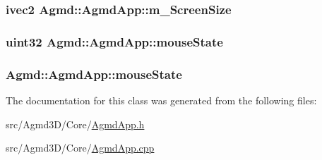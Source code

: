 \hypertarget{class_agmd_1_1_agmd_app_acc122b7ae41e81cabf3e1dfcea5c8ec5}{
\subsubsection[{m\+\_\+\+Screen\+Size}]{\setlength{\rightskip}{0pt plus 5cm}ivec2 Agmd\+::\+Agmd\+App\+::m\+\_\+\+Screen\+Size\hspace{0.3cm}{\ttfamily [protected]}}}\label{class_agmd_1_1_agmd_app_acc122b7ae41e81cabf3e1dfcea5c8ec5}
\hypertarget{class_agmd_1_1_agmd_app_ac57faa65a18bb1d5751b25e36364860e}{
\subsubsection[{mouse\+State}]{\setlength{\rightskip}{0pt plus 5cm}uint32 Agmd\+::\+Agmd\+App\+::mouse\+State\hspace{0.3cm}{\ttfamily [protected]}}}\label{class_agmd_1_1_agmd_app_ac57faa65a18bb1d5751b25e36364860e}
\hypertarget{class_agmd_1_1_agmd_app_ae44d69b5ac62fb8ac221140e883132af}{
\subsubsection[{mouse\+State}]{ Agmd\+::\+Agmd\+App\+::mouse\+State\hspace{0.3cm}{\ttfamily [protected]}}}\label{class_agmd_1_1_agmd_app_ae44d69b5ac62fb8ac221140e883132af}


The documentation for this class was generated from the following files\+:\begin{DoxyCompactItemize}
\item 
src/\+Agmd3\+D/\+Core/\hyperlink{_agmd3_d_2_core_2_agmd_app_8h}{Agmd\+App.\+h}\item 
src/\+Agmd3\+D/\+Core/\hyperlink{_agmd3_d_2_core_2_agmd_app_8cpp}{Agmd\+App.\+cpp}\end{DoxyCompactItemize}
